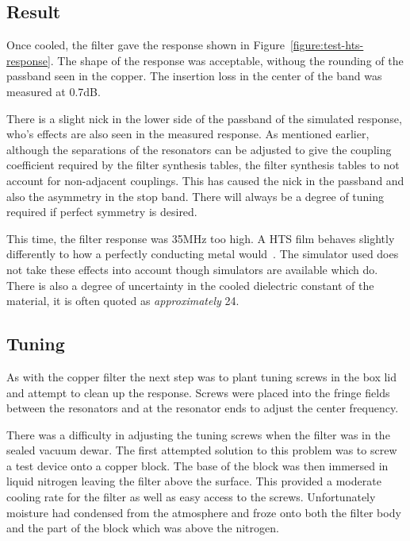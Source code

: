 \subsection{Result}
Once cooled, the filter gave the response shown in Figure~\ref{figure:test-hts-response}. The shape of the response was acceptable, withoug the rounding of the passband seen in the copper. The insertion loss in the center of the band was measured at 0.7dB.

There is a slight nick in the lower side of the passband of the simulated response, who's effects are also seen in the measured response. As mentioned earlier, although the separations of the resonators can be adjusted to give the coupling coefficient required by the filter synthesis tables, the filter synthesis tables to not account for non-adjacent couplings. This has caused the nick in the passband and also the asymmetry in the stop band. There will always be a degree of tuning required if perfect symmetry is desired.

This time, the filter response was 35MHz too high. A HTS film behaves slightly differently to how a perfectly conducting metal would~\cite{Shen:hts}. The simulator used does not take these effects into account though simulators are available which do. There is also a degree of uncertainty in the cooled dielectric constant of the material, it is often quoted as \emph{approximately} 24. 


\subsection{Tuning}
As with the copper filter the next step was to plant tuning screws in the box lid and attempt to clean up the response. Screws were placed into the fringe fields between the resonators and at the resonator ends to adjust the center frequency.

There was a difficulty in adjusting the tuning screws when the filter was in the sealed vacuum dewar. The first attempted solution to this problem was to screw a test device onto a copper block. The base of the block was then immersed in liquid nitrogen leaving the filter above the surface. This provided a moderate cooling rate for the filter as well as easy access to the screws. Unfortunately moisture had condensed from the atmosphere and froze onto both the filter body and the part of the block which was above the nitrogen.


